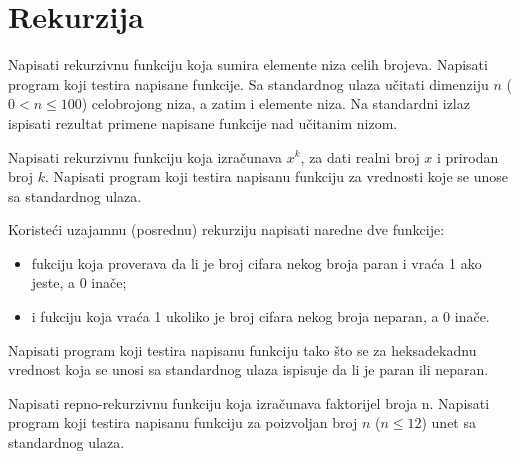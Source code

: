 


\section{Rekurzija}

\begin{Exercise}[label=101]
Napisati rekurzivnu funkciju koja sumira elemente niza celih brojeva.  Napisati program koji testira napisane funkcije. Sa standardnog ulaza učitati dimenziju $n$  ($0 < n \leq 100$) celobrojong
niza, a zatim i elemente niza. Na standardni izlaz ispisati
rezultat primene napisane funkcije nad učitanim
nizom.
\end{Exercise}
\begin{Answer}[ref=101]
\end{Answer}

\begin{Exercise}[label=102]
 Napisati rekurzivnu funkciju koja izračunava  $x^k$,  za dati realni broj $x$ i prirodan broj $k$. Napisati program koji testira napisanu funkciju za vrednosti koje se unose sa standardnog ulaza.
\end{Exercise}
\begin{Answer}[ref=102]
\end{Answer}

\begin{Exercise}[label=104]
 Koristeći uzajamnu (posrednu) rekurziju napisati naredne dve funkcije:
 \begin{itemize}
\item fukciju  koja proverava da li je broj cifara nekog broja paran i vraća 1 ako jeste, a 0 inače;
\item i fukciju  koja vraća 1 ukoliko je broj cifara nekog broja neparan, a 0 inače.
 \end{itemize}
 Napisati program koji testira napisanu funkciju tako što se za heksadekadnu vrednost koja se unosi sa standardnog ulaza ispisuje da li je paran ili neparan.
\end{Exercise}
\begin{Answer}[ref=104]
\end{Answer}

\begin{Exercise}[label=105]
  Napisati repno-rekurzivnu funkciju koja izračunava faktorijel broja n. Napisati program koji testira napisanu funkciju za poizvoljan broj $n$ ($n \le 12$) unet sa standardnog ulaza.
\end{Exercise}
\begin{Answer}[ref=105]
\end{Answer}



